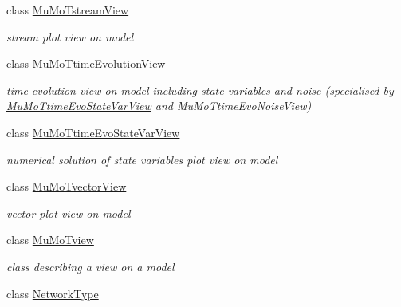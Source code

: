 \begin{DoxyCompactItemize}
class \hyperlink{class_mu_mo_t_1_1_mu_mo_t_1_1_mu_mo_tstream_view}{Mu\+Mo\+Tstream\+View}
\begin{DoxyCompactList}\small\item\em stream plot view on model \end{DoxyCompactList}\item 
class \hyperlink{class_mu_mo_t_1_1_mu_mo_t_1_1_mu_mo_ttime_evolution_view}{Mu\+Mo\+Ttime\+Evolution\+View}
\begin{DoxyCompactList}\small\item\em time evolution view on model including state variables and noise (specialised by \hyperlink{class_mu_mo_t_1_1_mu_mo_t_1_1_mu_mo_ttime_evo_state_var_view}{Mu\+Mo\+Ttime\+Evo\+State\+Var\+View} and Mu\+Mo\+Ttime\+Evo\+Noise\+View) \end{DoxyCompactList}\item 
class \hyperlink{class_mu_mo_t_1_1_mu_mo_t_1_1_mu_mo_ttime_evo_state_var_view}{Mu\+Mo\+Ttime\+Evo\+State\+Var\+View}
\begin{DoxyCompactList}\small\item\em numerical solution of state variables plot view on model \end{DoxyCompactList}\item 
class \hyperlink{class_mu_mo_t_1_1_mu_mo_t_1_1_mu_mo_tvector_view}{Mu\+Mo\+Tvector\+View}
\begin{DoxyCompactList}\small\item\em vector plot view on model \end{DoxyCompactList}\item 
class \hyperlink{class_mu_mo_t_1_1_mu_mo_t_1_1_mu_mo_tview}{Mu\+Mo\+Tview}
\begin{DoxyCompactList}\small\item\em class describing a view on a model \end{DoxyCompactList}\item 
class \hyperlink{class_mu_mo_t_1_1_mu_mo_t_1_1_network_type}{Network\+Type}
\end{DoxyCompactItemize}
